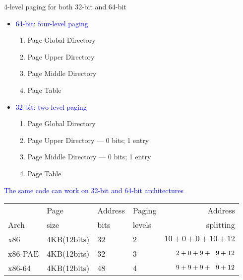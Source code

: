 \begin{frame}%
  \begin{block}{4-level paging for both 32-bit and 64-bit}
    \begin{itemize}
    \item \textcolor{blue}{64-bit: four-level paging}
      \begin{multicols}{2}
        \begin{enumerate}
        \item Page Global Directory
        \item Page Upper Directory
        \item Page Middle Directory
        \item Page Table
        \end{enumerate}
      \end{multicols}
    \item \textcolor{blue}{32-bit: two-level paging}
      \begin{multicols}{2}
        \begin{enumerate}
        \item Page Global Directory
        \item Page Upper Directory --- 0 bits; 1 entry
        \item Page Middle Directory --- 0 bits; 1 entry
        \item Page Table
        \end{enumerate}
      \end{multicols}
    \end{itemize}
    \textcolor{blue}{The same code can work on 32-bit and 64-bit architectures}
  \end{block}
    \begin{center}
    \begin{scriptsize}
      \begin{tabular}{llllr}
        \hline
        &Page &Address&Paging&Address\\
        Arch&size &bits &levels&splitting\\\hline
        x86 &4KB(12bits) &32 &2 &$10+0+0+10+12$\\\hline
        x86-PAE&4KB(12bits)&32&3&$2+0+9+\hspace{.6em}9+12$\\\hline
        x86-64&4KB(12bits)&48&4&$9+9+9+\hspace{.6em}9+12$\\\hline    
      \end{tabular}
    \end{scriptsize}
  \end{center}
\end{frame}

